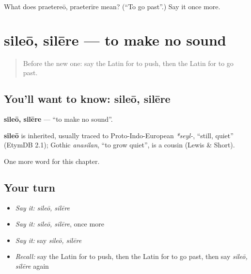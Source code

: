 \begin{tcolorbox}[breakable,colback=teal!4,colframe=teal!35!black,title={Before you move on}]
What does praetereō, praeterīre mean? (\textquotedblleft{}To go past\textquotedblright{}.) Say it once more.
\end{tcolorbox}
\section[sileō, silēre]{sileō, silēre — to make no sound}

\label{lesson:LA-C258-sileo}



\begin{quote}
Before the new one: say the Latin for to push, then the Latin for to go past.
\end{quote}

\subsection*{You'll want to know: sileō, silēre}
\textbf{sileō, silēre} — \textquotedblleft{}to make no sound\textquotedblright{}.

\begin{cousinweb}
\textbf{sileō} is inherited, usually traced to Proto-Indo-European \emph{*seyl-}, \textquotedblleft{}still, quiet\textquotedblright{} (EtymDB 2.1); Gothic \emph{anasilan}, \textquotedblleft{}to grow quiet\textquotedblright{}, is a cousin (Lewis \& Short).
\end{cousinweb}

\begin{grammarlens}[title={What you've built}]
One more word for this chapter.
\end{grammarlens}

\subsection*{Your turn}
\begin{itemize}
\raggedright
  \item \emph{Say it:} \emph{sileō, silēre}
  \item \emph{Say it:} \emph{sileō, silēre}, once more
  \item \emph{Say it:} say \emph{sileō, silēre}
  \item \emph{Recall:} say the Latin for to push, then the Latin for to go past, then say \emph{sileō, silēre} again
\end{itemize}

